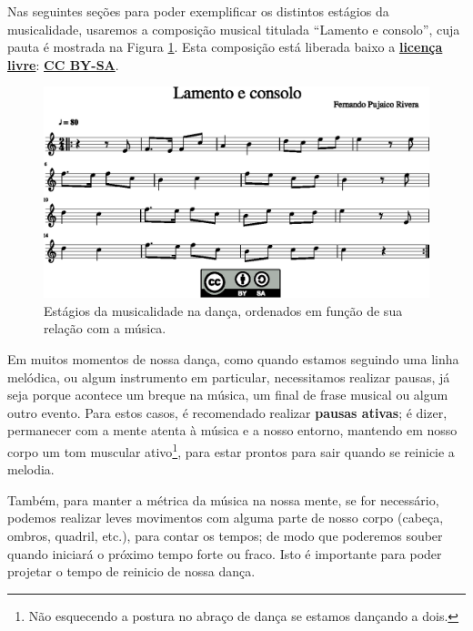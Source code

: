 Nas seguintes seções para poder exemplificar os distintos estágios da musicalidade,
usaremos a composição musical titulada ``Lamento e consolo'',
cuja pauta é mostrada na Figura \ref{fig:lamento-e-consolo}.
Esta composição está liberada baixo a 
\hyperref[ref:licensalivre]{\textbf{licença livre}}:
\hyperref[subsec:CCBYSA]{\textbf{CC BY-SA}}.

\begin{figure}
    \centering
    \includegraphics[width=\textwidth]{chapters/cap-musicalidade-tecnica/lamento-e-consolo-1.eps}
    \caption{Estágios da musicalidade na dança, ordenados em função de sua relação com a música.}
    \label{fig:lamento-e-consolo}
\end{figure}

\begin{elaboracion}[title=Pausa ativa, width= 1.0\linewidth]
\label{ref:pausaativa}
Em muitos momentos de nossa dança, como quando estamos seguindo uma linha melódica,
ou algum instrumento em particular, necessitamos realizar pausas, 
já seja porque acontece um breque na música, um final de frase musical ou algum outro evento.
Para estos casos, é recomendado realizar \textbf{pausas ativas}; é dizer,
permanecer com a mente atenta à música e a nosso entorno, 
mantendo em nosso corpo um tom muscular ativo\footnote{Não 
esquecendo a postura no abraço de dança se estamos dançando a dois. }, 
para estar prontos para sair quando se reinicie a melodia.

Também, para manter a métrica da música na nossa mente,
se for necessário, 
podemos realizar leves movimentos com alguma parte de nosso corpo (cabeça, ombros, quadril, etc.),
para contar os tempos;  
de modo que poderemos souber quando iniciará o próximo tempo forte ou fraco.
Isto é importante para poder projetar o tempo de reinicio de nossa dança.
\end{elaboracion}



